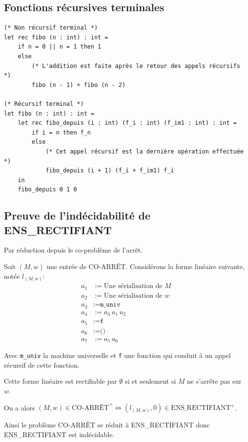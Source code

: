\subsection{Fonctions récursives terminales}

\addtocounter{framenumber}{-1}
\begin{frame}[fragile,t]
  \tiny \begin{verbatim}
(* Non récursif terminal *)
let rec fibo (n : int) : int =
    if n = 0 || n = 1 then 1
    else
        (* L'addition est faite après le retour des appels récursifs *)
        fibo (n - 1) + fibo (n - 2)

(* Récursif terminal *)
let fibo (n : int) : int =
    let rec fibo_depuis (i : int) (f_i : int) (f_im1 : int) : int =
        if i = n then f_n
        else
            (* Cet appel récursif est la dernière opération effectuée *)
            fibo_depuis (i + 1) (f_i + f_im1) f_i
    in
    fibo_depuis 0 1 0
    \end{verbatim}
\end{frame}

\small

\subsection{Preuve de l'indécidabilité de ENS\_RECTIFIANT}
Par réduction depuis le co-problème de l'arrêt.

Soit $(M, w)$ une entrée de CO-ARRÊT. Considérons la forme linéaire suivante,
notée $l_{(M, w)}$:
\begin{align*}
  a_1 & := \text{Une sérialisation de $M$} \\
  a_2 & := \text{Une sérialisation de $w$} \\
  a_3 & := \texttt{m\_univ}                \\
  a_4 & := a_3\  a_1\  a_2                 \\
  a_5 & := \texttt{f}                      \\
  a_6 & := \texttt{()}                     \\
  a_7 & := a_5 \ a_6
\end{align*}

Avec \texttt{m\_univ} la machine universelle et \texttt{f} une fonction qui
conduit à un appel récursif de cette fonction.

Cette forme linéaire est rectifiable par $\emptyset$ si et seulement si $M$
ne s'arrête pas sur $w$.

On a alors
$(M, w) \in \text{CO-ARRÊT}^+ \iff (l_{(M, w)}, 0) \in \text{ENS\_RECTIFIANT}^+$.

Ainsi le problème CO-ARRÊT se réduit à ENS\_RECTIFIANT donc ENS\_RECTIFIANT
est indécidable.
